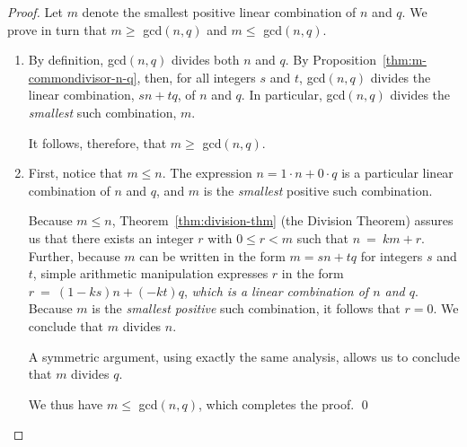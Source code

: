 \begin{proof}
Let $m$ denote the smallest positive linear combination of $n$ and $q$.  We prove in turn that $m \geq$ {\sc gcd}$(n, q)$ and $m \leq$ {\sc gcd}$(n, q)$. 
\begin{enumerate}
\item 
By definition, {\sc gcd}$(n, q)$ divides both $n$ and $q$.  By 
Proposition~\ref{thm:m-commondivisor-n-q}, then, for all integers $s$ and $t$, {\sc gcd}$(n, q)$ divides the linear combination, $s n +t q$, of $n$ and $q$.  In particular, {\sc gcd}$(n, q)$ divides the {\em smallest} such combination, $m$. 

\smallskip

It follows, therefore, that $m \geq$ {\sc gcd}$(n, q)$.
\item
First, notice that $m \leq n$.  The expression $n = 1 \cdot n + 0 \cdot q$ is a particular linear combination of $n$ and $q$, and $m$ is the {\em smallest} positive such combination.   

\smallskip

Because $m \leq n$, Theorem~\ref{thm:division-thm} (the Division Theorem) assures us that there exists an integer $r$ with $0 \leq r < m$ such that $n \ = \ k m + r$.  Further, because $m$ can be written in the form $m = s n+t q$ for integers $s$ and $t$, simple arithmetic manipulation expresses $r$ in the form $r \ = \ (1 - k s)n + (-k t)q$,  {\em which is a linear combination of $n$ and $q$}.  Because $m$ is the {\em smallest positive} such combination, it follows that $r=0$.  We conclude that $m$ divides $n$.

\smallskip

A symmetric argument, using exactly the same analysis, allows us to conclude that $m$ divides $q$.

\smallskip

We thus have $m \leq$ {\sc gcd}$(n, q)$, which completes the proof.  \qed
\end{enumerate}


\end{proof}
